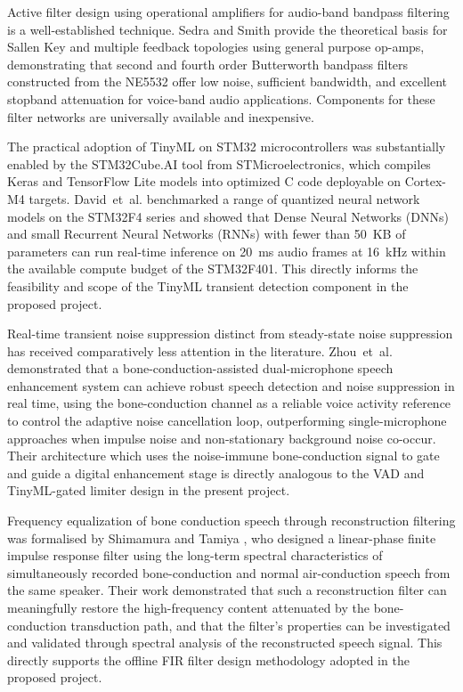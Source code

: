 Active filter design using operational amplifiers for audio-band bandpass filtering is a well-established technique. Sedra and Smith \cite{sedra2014} provide the theoretical basis for Sallen Key and multiple feedback topologies using general purpose op-amps, demonstrating that second and fourth order Butterworth bandpass filters constructed from the NE5532 offer low noise, sufficient bandwidth, and excellent stopband attenuation for voice-band audio applications. Components for these filter networks are universally available and inexpensive.

The practical adoption of TinyML on STM32 microcontrollers was substantially enabled by the STM32Cube.AI tool from STMicroelectronics, which compiles Keras and TensorFlow Lite models into optimized C code deployable on Cortex-M4 targets. David~et~al. \cite{david2021} benchmarked a range of quantized neural network models on the STM32F4 series and showed that Dense Neural Networks (DNNs) and small Recurrent Neural Networks (RNNs) with fewer than 50~KB of parameters can run real-time inference on 20~ms audio frames at 16~kHz within the available compute budget of the STM32F401. This directly informs the feasibility and scope of the TinyML transient detection component in the proposed project.

Real-time transient noise suppression distinct from steady-state noise suppression has received comparatively less attention in the literature. Zhou~et~al. \cite{zhou2020} demonstrated that a bone-conduction-assisted dual-microphone speech enhancement system can achieve robust speech detection and noise suppression in real time, using the bone-conduction channel as a reliable voice activity reference to control the adaptive noise cancellation loop, outperforming single-microphone approaches when impulse noise and non-stationary background noise co-occur. Their architecture which uses the noise-immune bone-conduction signal to gate and guide a digital enhancement stage is directly analogous to the VAD and TinyML-gated limiter design in the present project.

Frequency equalization of bone conduction speech through reconstruction filtering was formalised by Shimamura and Tamiya \cite{shimamura2006}, who designed a linear-phase finite impulse response filter using the long-term spectral characteristics of simultaneously recorded bone-conduction and normal air-conduction speech from the same speaker. Their work demonstrated that such a reconstruction filter can meaningfully restore the high-frequency content attenuated by the bone-conduction transduction path, and that the filter's properties can be investigated and validated through spectral analysis of the reconstructed speech signal. This directly supports the offline FIR filter design methodology adopted in the proposed project.

